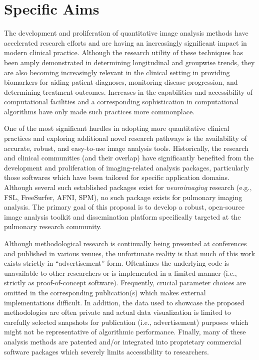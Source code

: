 \documentclass[11pt,]{article}
\title{}
\author{}
\date{}
\begin{document}
\maketitle


\section{Specific Aims}\label{specific-aims}

The development and proliferation of quantitative image analysis methods
have accelerated research efforts and are having an increasingly
significant impact in modern clinical practice. Although the research
utility of these techniques has been amply demonstrated in determining
longitudinal and groupwise trends, they are also becoming increasingly
relevant in the clinical setting in providing biomarkers for aiding
patient diagnoses, monitoring disease progression, and determining
treatment outcomes. Increases in the capabilities and accessibility of
computational facilities and a corresponding sophistication in
computational algorithms have only made such practices more commonplace.

One of the most significant hurdles in adopting more quantitative
clinical practices and exploring additional novel research pathways is
the availability of accurate, robust, and easy-to-use image analysis
tools. Historically, the research and clinical communities (and their
overlap) have significantly benefited from the development and
proliferation of imaging-related analysis packages, particularly those
softwares which have been tailored for specific application domains.
Although several such established packages exist for \emph{neuroimaging}
research (e.g., FSL, FreeSurfer, AFNI, SPM), no such package exists for
pulmonary imaging analysis. The primary goal of this proposal is to
develop a robust, open-source image analysis toolkit and dissemination
platform specifically targeted at the pulmonary research community.

Although methodological research is continually being presented at
conferences and published in various venues, the unfortunate reality is
that much of this work exists strictly in ``advertisement'' form.
Oftentimes the underlying code is unavailable to other researchers or is
implemented in a limited manner (i.e., strictly as proof-of-concept
software). Frequently, crucial parameter choices are omitted in the
corresponding publication(s) which makes external implementations
difficult. In addition, the data used to showcase the proposed
methodologies are often private and actual data visualization is limited
to carefully selected snapshots for publication (i.e., advertisement)
purposes which might not be representative of algorithmic performance.
Finally, many of these analysis methods are patented and/or integrated
into proprietary commercial software packages which severely limits
accessibility to researchers.
\end{document}
